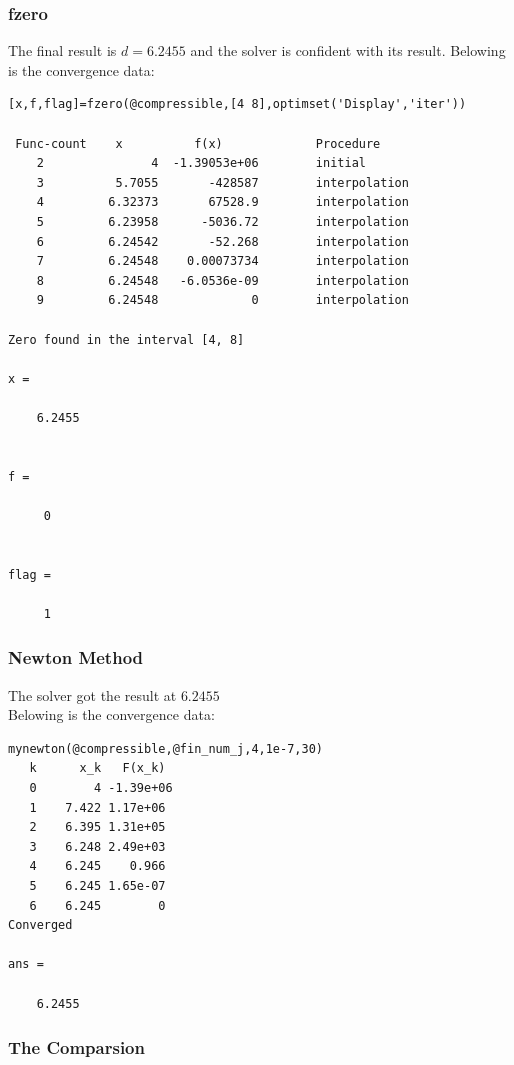 \documentclass[11pt]{article}
\begin{document}
\subsubsection{fzero}

The final result is $d=6.2455$ and the solver is confident with its result. Belowing is the convergence data:
\begin{verbatim}
[x,f,flag]=fzero(@compressible,[4 8],optimset('Display','iter'))
 
 Func-count    x          f(x)             Procedure
    2               4  -1.39053e+06        initial
    3          5.7055       -428587        interpolation
    4         6.32373       67528.9        interpolation
    5         6.23958      -5036.72        interpolation
    6         6.24542       -52.268        interpolation
    7         6.24548    0.00073734        interpolation
    8         6.24548   -6.0536e-09        interpolation
    9         6.24548             0        interpolation
 
Zero found in the interval [4, 8]

x =

    6.2455


f =

     0


flag =

     1
\end{verbatim}

\subsubsection{Newton Method}

The solver got the result at $6.2455$\\


Belowing is the convergence data:
\begin{verbatim}
mynewton(@compressible,@fin_num_j,4,1e-7,30)
   k      x_k   F(x_k)
   0        4 -1.39e+06
   1    7.422 1.17e+06
   2    6.395 1.31e+05
   3    6.248 2.49e+03
   4    6.245    0.966
   5    6.245 1.65e-07
   6    6.245        0
Converged

ans =

    6.2455
\end{verbatim}

\subsubsection{The Comparsion}
\end{document}
